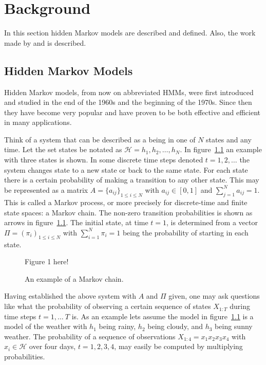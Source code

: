 
\chapter{Background}
\label{cha:background}

In this section hidden Markov models are described and defined. Also, the work
made by \citet{lifshits2009speeding} and \citet{sand2013ziphmmlib} is described.

\section{Hidden Markov Models}
\label{sec:hidden-markov-models}

Hidden Markov models, from now on abbreviated HMMs, were first introduced and
studied in the end of the 1960s and the beginning of the 1970s. Since then they
have become very popular and have proven to be both effective and efficient in
many applications. \citep{rabiner1989tutorial}

Think of a system that can be described as a being in one of $N$ states and any
time. Let the set states be notated as $\mathcal{H} = {h_1, h_2, \dots, h_N}$.
In figure~\ref{fig:markov-chain} an example with three states is shown. In some
discrete time steps denoted $t = 1, 2, \dots$ the system changes state to a new
state or back to the same state. For each state there is a certain probability
of making a transition to any other state. This may be represented as a matrix
$A = {\{a_{ij}\}}_{1 \le i \le N}$ with $a_{ij} \in [0, 1]$ and
$\sum_{j = 1}^N a_{ij} = 1$. This is called a Markov process, or more precisely
for discrete-time and finite state spaces: a Markov chain. The non-zero
transition probabilities is shown as arrows in
figure~\ref{fig:markov-chain}. The initial state, at time $t = 1$, is
determined from a vector $\Pi = {(\pi_i)}_{1 \le i \le N}$ with
$\sum_{i=1}^N \pi_i = 1$ being the probability of starting in each state.

\begin{figure}
  \centering
  Figure 1 here!
  \caption{An example of a Markov chain.}
  \label{fig:markov-chain}
\end{figure}

Having established the above system with $A$ and $\Pi$ given, one may ask
questions like what the probability of observing a certain sequence of states
$X_{1:T}$ during time steps $t = 1, \dots\ T$ is. As an example lets assume the
model in figure~\ref{fig:markov-chain} is a model of the weather with $h_1$
being rainy, $h_2$ being cloudy, and $h_3$ being sunny weather. The probability
of a sequence of observations $X_{1:4} = x_1x_2x_3x_4$ with
$x_i \in \mathcal{H}$ over four days, $t = 1, 2, 3, 4$, may easily be computed
by multiplying probabilities.

